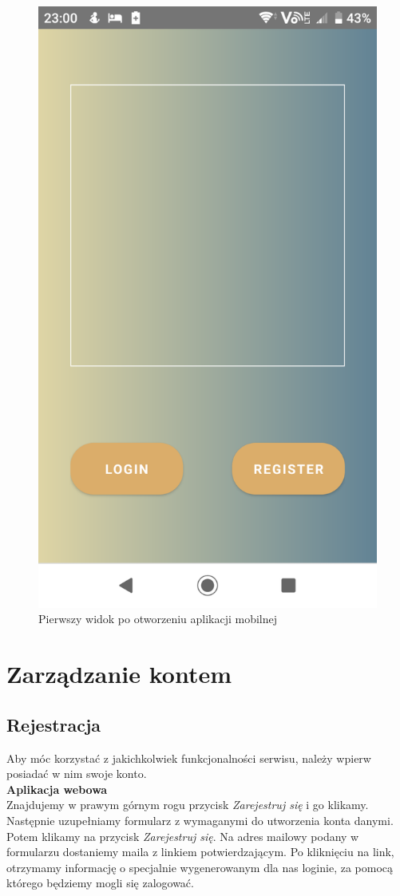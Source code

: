 \documentclass{article}
\begin{document}
\begin{figure}[H]
    \centering
    \includegraphics[width=0.5\linewidth]{images/mobile/first_view.png}
    \caption{Pierwszy widok po otworzeniu aplikacji mobilnej}
    \label{fig:test3_label}
\end{figure}

\section{Zarządzanie kontem}

\subsection{Rejestracja}
Aby móc korzystać z jakichkolwiek funkcjonalności serwisu, należy wpierw posiadać w nim swoje konto. \\

\textbf{Aplikacja webowa} \\
Znajdujemy w prawym górnym rogu przycisk \emph{Zarejestruj się} i go klikamy. Następnie uzupełniamy formularz z wymaganymi do utworzenia konta danymi.
Potem klikamy na przycisk \emph{Zarejestruj się}. Na adres mailowy podany w formularzu dostaniemy maila z linkiem potwierdzającym. Po kliknięciu na link, otrzymamy informację o specjalnie wygenerowanym dla nas loginie, za pomocą którego będziemy mogli się zalogować.
\end{document}
